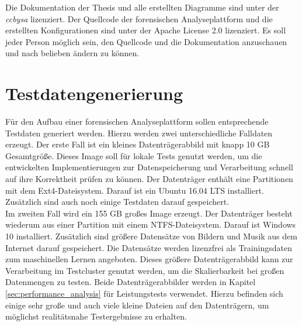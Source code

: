 \noindent
Die Dokumentation der Thesis und alle erstellten Diagramme sind unter der \textit{\gls{ccbysa}} lizenziert. Der Quellcode der forensischen Analyseplattform und die erstellten Konfigurationen sind unter der Apache License 2.0 lizenziert. Es soll jeder Person möglich sein, den Quellcode und die Dokumentation anzuschauen und nach belieben ändern zu können.\\

\section{Testdatengenerierung}
\label{testdatacreation}
Für den Aufbau einer forensischen Analyseplattform sollen entsprechende Testdaten generiert werden. Hierzu werden zwei unterschiedliche Falldaten erzeugt. Der erste Fall ist ein kleines Datenträgerabbild mit knapp 10 GB Gesamtgröße. Dieses Image soll für lokale Tests genutzt werden, um die entwickelten Implementierungen zur Datenspeicherung und Verarbeitung schnell auf ihre Korrektheit prüfen zu können. Der Datenträger enthält eine Partitionen mit dem Ext4-Dateisystem. Darauf ist ein Ubuntu 16.04 LTS installiert. Zusätzlich sind auch noch einige Testdaten darauf gespeichert.\\

\noindent
Im zweiten Fall wird ein 155 GB großes Image erzeugt. Der Datenträger besteht wiederum aus einer Partition mit einem NTFS-Dateisystem. Darauf ist Windows 10 installiert. Zusätzlich sind größere Datensätze von Bildern und Musik aus dem Internet darauf gespeichert. Die Datensätze werden lizenzfrei als Trainingsdaten zum maschinellen Lernen angeboten. Dieses größere Datenträgerabbild kann zur Verarbeitung im Testcluster genutzt werden, um die Skalierbarkeit bei großen Datenmengen zu testen. Beide Datenträgerabbilder werden in Kapitel \ref{sec:performance_analysis} für Leistungstests verwendet. Hierzu befinden sich einige sehr große und auch viele kleine Dateien auf den Datenträgern, um möglichst realitätsnahe Testergebnisse zu erhalten.